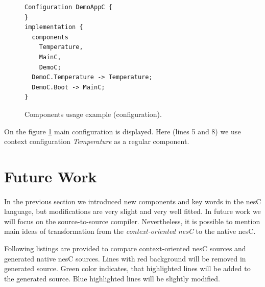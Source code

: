 \documentclass[12pt,a4paper]{article}
\begin{document}
\begin{figure}[H]
\begin{lstlisting}
Configuration DemoAppC {
}
implementation {
  components
    Temperature,
    MainC,
    DemoC;
  DemoC.Temperature -> Temperature;
  DemoC.Boot -> MainC;
}
\end{lstlisting}
\caption{Components usage example (configuration).}
\label{fig:cuec}
\end{figure}

On the figure \ref{fig:cuec} main configuration is displayed. Here (lines 5 and 8) we use context configuration \textit{Temperature} as a regular component.

\section{Future Work}
\paragraph{}
In the previous section we introduced new components and key words in the nesC language, but modifications are very slight and very well fitted. In future work we will focus on the source-to-source compiler. Nevertheless, it is possible to mention main ideas of transformation from the \textit{context-oriented nesC} to the native nesC.

Following listings are provided to compare context-oriented nesC sources and generated native nesC sources. Lines with red background will be removed in generated source. Green color indicates, that highlighted lines will be added to the generated source. Blue highlighted lines will be slightly modified.
\end{document}
